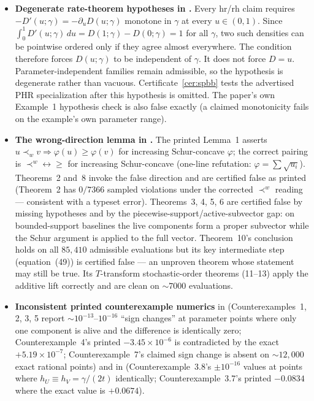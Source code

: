 \documentclass[10pt]{article}
\theoremstyle{plain}
\theoremstyle{definition}
\theoremstyle{remark}
\begin{document}
\begin{itemize}
\item \textbf{Degenerate rate-theorem hypotheses in \cite{ShekariEtAl2026}.} Every hr/rh claim requires $-D'(u;\gamma)=-\partial_uD(u;\gamma)$ monotone in $\gamma$ at every $u\in(0,1)$. Since $\int_0^1D'(u;\gamma)\,du=D(1;\gamma)-D(0;\gamma)=1$ for all $\gamma$, two such densities can be pointwise ordered only if they agree almost everywhere. The condition therefore forces $D\!\left(u;\gamma\right)$ to be independent of $\gamma$. It does not force $D=u$. Parameter-independent families remain admissible, so the hypothesis is degenerate rather than vacuous. Certificate~\ref{cer:spbb} tests the advertised PHR specialization after this hypothesis is omitted. The paper's own Example~1 hypothesis check is also false exactly (a claimed monotonicity fails on the example's own parameter range).
\item \textbf{The wrong-direction lemma in \cite{BhaktaKayalFinkelstein2024}.} The printed Lemma~1 asserts $u\prec_w v\Rightarrow\varphi(u)\ge\varphi(v)$ for increasing Schur-concave $\varphi$; the correct pairing is $\prec^w\leftrightarrow\ge$ for increasing Schur-concave (one-line refutation: $\varphi=\sum\sqrt{u_i}$). Theorems~2 and~8 invoke the false direction and are certified false as printed (Theorem~2 has $0/7366$ sampled violations under the corrected $\prec^w$ reading --- consistent with a typeset error). Theorems~3, 4, 5, 6 are certified false by missing hypotheses and by the piecewise-support/active-subvector gap: on bounded-support baselines the live components form a proper subvector while the Schur argument is applied to the full vector. Theorem~10's conclusion holds on all $85{,}410$ admissible evaluations but its key intermediate step (equation~(49)) is certified false --- an unproven theorem whose statement may still be true. Its $T$-transform stochastic-order theorems (11--13) apply the additive lift correctly and are clean on ${\sim}7000$ evaluations.
\item \textbf{Inconsistent printed counterexample numerics} in \cite{BhaktaKayalFinkelstein2024} (Counterexamples~1, 2, 3, 5 report $\sim10^{-13}$--$10^{-16}$ ``sign changes'' at parameter points where only one component is alive and the difference is identically zero; Counterexample~4's printed $-3.45\times10^{-6}$ is contradicted by the exact $+5.19\times10^{-7}$; Counterexample~7's claimed sign change is absent on ${\sim}12{,}000$ exact rational points) and in \cite{SahooKayalFinkelstein2026} (Counterexample~3.8's $\pm10^{-16}$ values at points where $h_U\equiv h_V=\gamma/(2t)$ identically; Counterexample~3.7's printed $-0.0834$ where the exact value is $+0.0674$).

\end{itemize}
\end{document}
